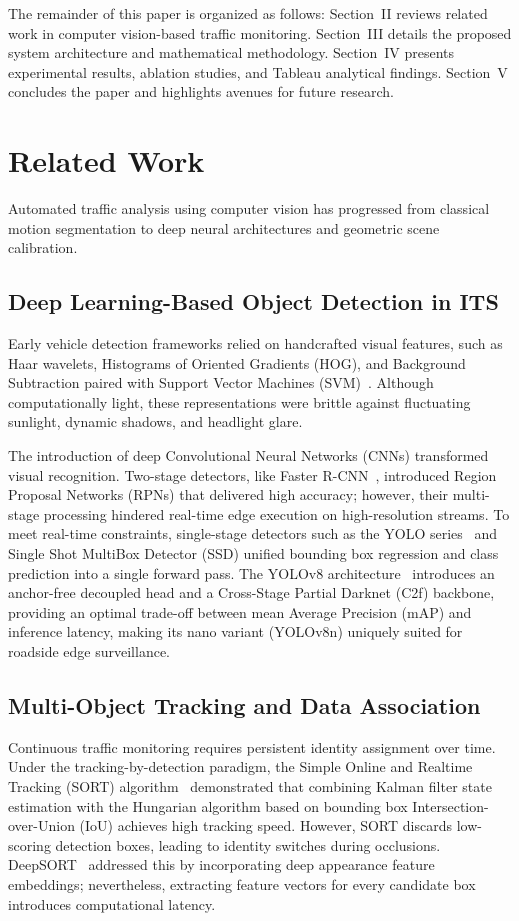 \documentclass[conference]{IEEEtran}
\begin{document}
The remainder of this paper is organized as follows: Section~II reviews related work in computer vision-based traffic monitoring. Section~III details the proposed system architecture and mathematical methodology. Section~IV presents experimental results, ablation studies, and Tableau analytical findings. Section~V concludes the paper and highlights avenues for future research.

\section{Related Work}
Automated traffic analysis using computer vision has progressed from classical motion segmentation to deep neural architectures and geometric scene calibration.

\subsection{Deep Learning-Based Object Detection in ITS}
Early vehicle detection frameworks relied on handcrafted visual features, such as Haar wavelets, Histograms of Oriented Gradients (HOG), and Background Subtraction paired with Support Vector Machines (SVM)~\cite{buch2011review}. Although computationally light, these representations were brittle against fluctuating sunlight, dynamic shadows, and headlight glare.

The introduction of deep Convolutional Neural Networks (CNNs) transformed visual recognition. Two-stage detectors, like Faster R-CNN~\cite{ren2015faster}, introduced Region Proposal Networks (RPNs) that delivered high accuracy; however, their multi-stage processing hindered real-time edge execution on high-resolution streams. To meet real-time constraints, single-stage detectors such as the YOLO series~\cite{redmon2016you, redmon2018yolov3, bochkovskiy2020yolov4} and Single Shot MultiBox Detector (SSD) unified bounding box regression and class prediction into a single forward pass. The YOLOv8 architecture~\cite{ultralytics2023yolov8} introduces an anchor-free decoupled head and a Cross-Stage Partial Darknet (C2f) backbone, providing an optimal trade-off between mean Average Precision (mAP) and inference latency, making its nano variant (YOLOv8n) uniquely suited for roadside edge surveillance.

\subsection{Multi-Object Tracking and Data Association}
Continuous traffic monitoring requires persistent identity assignment over time. Under the tracking-by-detection paradigm, the Simple Online and Realtime Tracking (SORT) algorithm~\cite{bewley2016simple} demonstrated that combining Kalman filter state estimation with the Hungarian algorithm based on bounding box Intersection-over-Union (IoU) achieves high tracking speed. However, SORT discards low-scoring detection boxes, leading to identity switches during occlusions. DeepSORT~\cite{wojke2017simple} addressed this by incorporating deep appearance feature embeddings; nevertheless, extracting feature vectors for every candidate box introduces computational latency.
\end{document}
